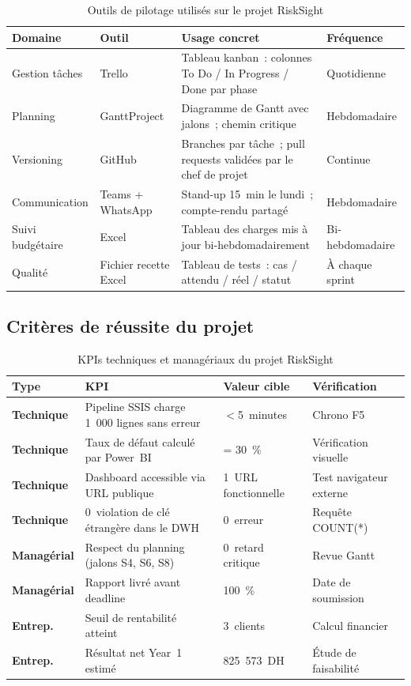 \documentclass[12pt, a4paper]{report}
\begin{document}
\begin{table}[H]
\centering
\caption{Outils de pilotage utilisés sur le projet RiskSight}
\label{tab:pilotage}
\renewcommand{\arraystretch}{1.4}
\begin{tabularx}{\textwidth}{p{2.5cm} p{2cm} X p{2.5cm}}
\toprule
\rowcolor{primary!12}
Domaine & Outil & Usage concret & Fréquence \\
\midrule
Gestion tâches & Trello & Tableau kanban~: colonnes To Do / In Progress / Done par phase & Quotidienne \\
Planning & GanttProject & Diagramme de Gantt avec jalons~; chemin critique & Hebdomadaire \\
Versioning & GitHub & Branches par tâche~; pull requests validées par le chef de projet & Continue \\
Communication & Teams + WhatsApp & Stand-up 15~min le lundi~; compte-rendu partagé & Hebdomadaire \\
Suivi budgétaire & Excel & Tableau des charges mis à jour bi-hebdomadairement & Bi-hebdomadaire \\
Qualité & Fichier recette Excel & Tableau de tests~: cas / attendu / réel / statut & À chaque sprint \\
\bottomrule
\end{tabularx}
\end{table}

\subsection{Critères de réussite du projet}

\begin{table}[H]
\centering
\caption{KPIs techniques et managériaux du projet RiskSight}
\label{tab:kpis}
\renewcommand{\arraystretch}{2}
\begin{tabularx}{\textwidth}{p{3cm} X p{3cm} p{3cm}}
\toprule
\rowcolor{primary!12}
Type & KPI & Valeur cible & Vérification \\
\midrule
\textbf{Technique} & Pipeline SSIS charge 1~000 lignes sans erreur & $<$5~minutes & Chrono F5 \\
\textbf{Technique} & Taux de défaut calculé par Power~BI & = 30~\% & Vérification visuelle \\
\textbf{Technique} & Dashboard accessible via URL publique & 1~URL fonctionnelle & Test navigateur externe \\
\textbf{Technique} & 0~violation de clé étrangère dans le DWH & 0~erreur & Requête COUNT(*) \\
\textbf{Managérial} & Respect du planning (jalons S4, S6, S8) & 0~retard critique & Revue Gantt \\
\textbf{Managérial} & Rapport livré avant deadline & 100~\% & Date de soumission \\
\textbf{Entrep.} & Seuil de rentabilité atteint & 3~clients & Calcul financier \\
\textbf{Entrep.} & Résultat net Year~1 estimé & 825~573~DH & Étude de faisabilité \\
\bottomrule
\end{tabularx}
\end{table}
\end{document}

